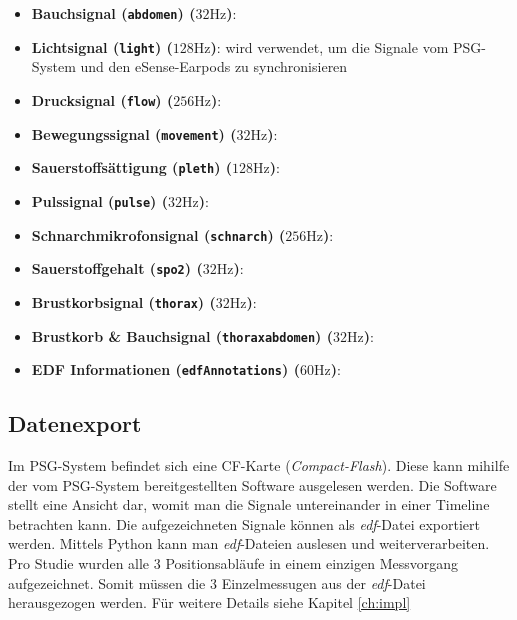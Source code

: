 \begin{itemize}
    \item \textbf{Bauchsignal (\texttt{abdomen}) ($32 \si{\hertz}$)}: 
    \item \textbf{Lichtsignal (\texttt{light}) ($128 \si{\hertz}$)}: wird verwendet, um die Signale vom PSG-System und den eSense-Earpods zu synchronisieren
    \item \textbf{Drucksignal (\texttt{flow}) ($256 \si{\hertz}$)}: 
    \item \textbf{Bewegungssignal (\texttt{movement}) ($32 \si{\hertz}$)}: 
    \item \textbf{Sauerstoffsättigung (\texttt{pleth}) ($128 \si{\hertz}$)}: 
    \item \textbf{Pulssignal (\texttt{pulse}) ($32 \si{\hertz}$)}: 
    \item \textbf{Schnarchmikrofonsignal (\texttt{schnarch}) ($256 \si{\hertz}$)}: 
    \item \textbf{Sauerstoffgehalt (\texttt{spo2}) ($32 \si{\hertz}$)}: 
    \item \textbf{Brustkorbsignal (\texttt{thorax}) ($32 \si{\hertz}$)}: 
    \item \textbf{Brustkorb \& Bauchsignal (\texttt{thoraxabdomen}) ($32 \si{\hertz}$)}: 
    \item \textbf{EDF Informationen (\texttt{edfAnnotations}) ($60 \si{\hertz}$)}: 
\end{itemize}

\subsection{Datenexport}
\label{ch:sa:psg:export}

Im PSG-System befindet sich eine CF-Karte (\textit{Compact-Flash}). Diese kann mihilfe der vom PSG-System bereitgestellten Software \glqq {}\grqq ausgelesen werden.
Die Software stellt eine Ansicht dar, womit man die Signale untereinander in einer Timeline betrachten kann. Die aufgezeichneten Signale können als \textit{edf}-Datei exportiert werden.
Mittels Python kann man \textit{edf}-Dateien auslesen und weiterverarbeiten.
Pro Studie wurden alle 3 Positionsabläufe in einem einzigen Messvorgang aufgezeichnet. Somit müssen die 3 Einzelmessugen aus der \textit{edf}-Datei herausgezogen werden.
Für weitere Details siehe Kapitel \ref{ch:impl} 

